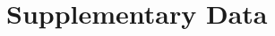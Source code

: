 \documentclass{standalone}
\begin{document}
\graphicspath{{./images/appendices/}}
\appendix

\chapter{Supplementary Data}
\label{app:supp}
% 
\end{document}
